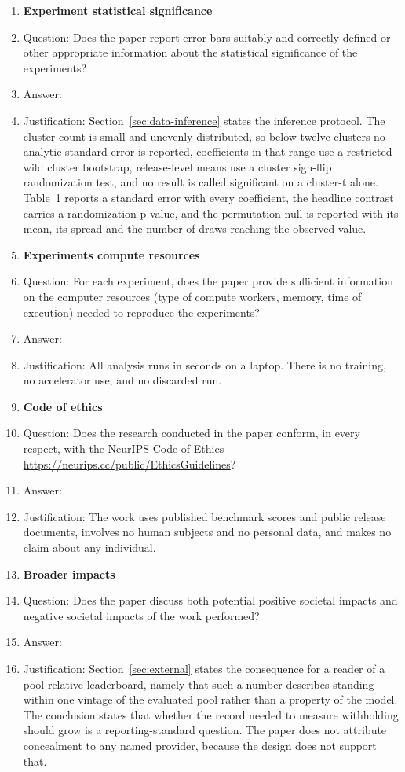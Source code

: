 \documentclass{article}
\begin{document}
\begin{enumerate}
\item {\bf Experiment statistical significance}
    \item[] Question: Does the paper report error bars suitably and correctly defined or other appropriate information about the statistical significance of the experiments?
    \item[] Answer: \answerYes{}
    \item[] Justification: Section~\ref{sec:data-inference} states the inference protocol. The cluster count is small and unevenly distributed, so below twelve clusters no analytic standard error is reported, coefficients in that range use a restricted wild cluster bootstrap, release-level means use a cluster sign-flip randomization test, and no result is called significant on a cluster-t alone. Table~1 reports a standard error with every coefficient, the headline contrast carries a randomization p-value, and the permutation null is reported with its mean, its spread and the number of draws reaching the observed value.


\item {\bf Experiments compute resources}
    \item[] Question: For each experiment, does the paper provide sufficient information on the computer resources (type of compute workers, memory, time of execution) needed to reproduce the experiments?
    \item[] Answer: \answerYes{}
    \item[] Justification: All analysis runs in seconds on a laptop. There is no training, no accelerator use, and no discarded run.


\item {\bf Code of ethics}
    \item[] Question: Does the research conducted in the paper conform, in every respect, with the NeurIPS Code of Ethics \url{https://neurips.cc/public/EthicsGuidelines}?
    \item[] Answer: \answerYes{}
    \item[] Justification: The work uses published benchmark scores and public release documents, involves no human subjects and no personal data, and makes no claim about any individual.



\item {\bf Broader impacts}
    \item[] Question: Does the paper discuss both potential positive societal impacts and negative societal impacts of the work performed?
    \item[] Answer: \answerYes{}
    \item[] Justification: Section~\ref{sec:external} states the consequence for a reader of a pool-relative leaderboard, namely that such a number describes standing within one vintage of the evaluated pool rather than a property of the model. The conclusion states that whether the record needed to measure withholding should grow is a reporting-standard question. The paper does not attribute concealment to any named provider, because the design does not support that.



\end{enumerate}
\end{document}
